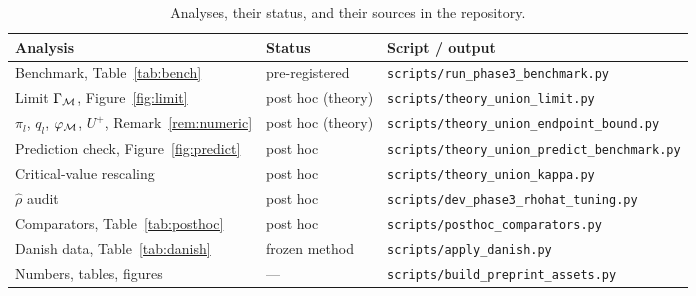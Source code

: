 \begin{table}[ht]
\centering\small
\caption{Analyses, their status, and their sources in the repository.}
\label{tab:analyses}
\begin{tabular}{lll}
\toprule
Analysis & Status & Script / output\\
\midrule
Benchmark, Table~\ref{tab:bench} & pre-registered & \texttt{scripts/run\_phase3\_benchmark.py}\\
Limit $\Gamma_{\mathcal{M}}$, Figure~\ref{fig:limit} & post hoc (theory) & \texttt{scripts/theory\_union\_limit.py}\\
$\pi_l$, $q_l$, $\varphi_{\mathcal{M}}$, $U^+$, Remark~\ref{rem:numeric} & post hoc (theory) & \texttt{scripts/theory\_union\_endpoint\_bound.py}\\
Prediction check, Figure~\ref{fig:predict} & post hoc & \texttt{scripts/theory\_union\_predict\_benchmark.py}\\
Critical-value rescaling & post hoc & \texttt{scripts/theory\_union\_kappa.py}\\
$\hat\rho$ audit & post hoc & \texttt{scripts/dev\_phase3\_rhohat\_tuning.py}\\
Comparators, Table~\ref{tab:posthoc} & post hoc & \texttt{scripts/posthoc\_comparators.py}\\
Danish data, Table~\ref{tab:danish} & frozen method & \texttt{scripts/apply\_danish.py}\\
Numbers, tables, figures & --- & \texttt{scripts/build\_preprint\_assets.py}\\
\bottomrule
\end{tabular}
\end{table}
